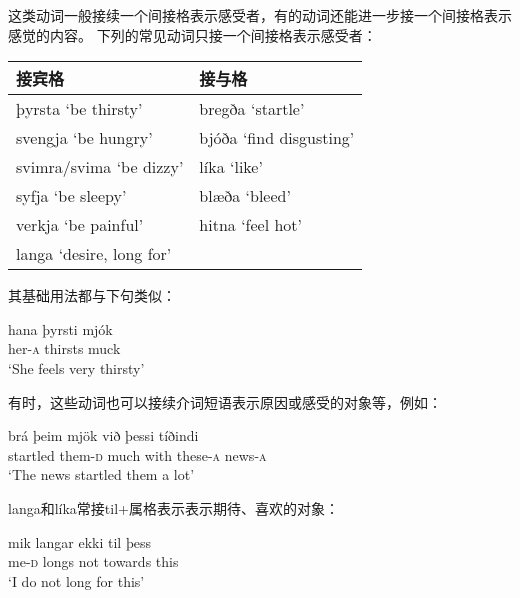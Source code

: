 \begin{enumerate}
\begin{enumerate}
                    这类动词一般接续一个间接格表示感受者，有的动词还能进一步接一个间接格表示感觉的内容。
                    下列的常见动词只接一个间接格表示感受者：
                    \begin{table}[H]
                        \centering
                        \begin{tabular}{ll}
                            \toprule
                            接宾格                   & 接与格                  \\ \midrule
                            þyrsta `be thirsty’      & bregða `startle’        \\
                            svengja `be hungry’      & bjóða `find disgusting’ \\
                            svimra/svima `be dizzy’  & líka `like’             \\
                            syfja `be sleepy’        & blæða `bleed’           \\
                            verkja `be painful’      & hitna `feel hot’        \\
                            langa `desire, long for’ &                         \\
                            \bottomrule
                        \end{tabular}
                    \end{table}

                    其基础用法都与下句类似：
                    \begin{exe}
                        \ex \gll
                        hana	þyrsti	mjók\\
                        her-\textsc{a}	thirsts	muck	\\
                        \trans `She feels very thirsty’
                    \end{exe}

                    有时，这些动词也可以接续介词短语表示原因或感受的对象等，例如：
                    \begin{exe}
                        \ex \gll
                        brá	þeim	mjök	við	þessi	tíðindi\\
                        startled	them-\textsc{d}	much	with	these-\textsc{a}	news-\textsc{a}\\
                        \trans `The news startled them a lot’
                    \end{exe}

                    langa和líka常接til+属格表示表示期待、喜欢的对象：
                    \begin{exe}
                        \ex \gll
                        mik	langar	ekki	til	þess\\
                        me-\textsc{d}	longs	not	towards	this\\
                        \trans `I do not long for this’
                    \end{exe}


\end{enumerate}
\end{enumerate}
